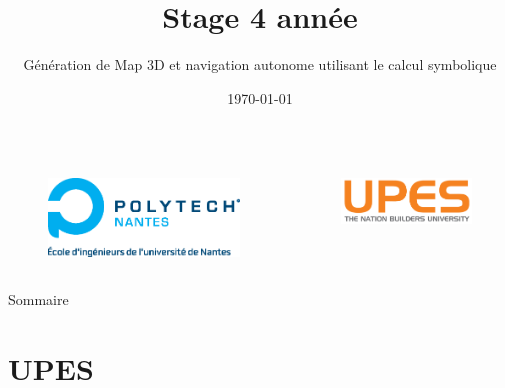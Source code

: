 \documentclass[xcolor=x11names,compress]{beamer}
\title{Stage 4\up{ème} année}
\subtitle{Génération de Map 3D et navigation autonome utilisant le calcul symbolique}
\author[Maxime PINEAU]{ 
   \texorpdfstring{
        \begin{columns}                
            \column{.33\linewidth}
            \centering
            {Enseignant Polytech\\ Benoît PARREIN}
            \column{.33\linewidth}
            \centering
            {Par \\ Maxime PINEAU}
            \column{.33\linewidth}
            \centering
            {Maître de stage\\ Niharika SINGH}
        \end{columns}
   }
   {Maxime PINEAU}
}
\date{\today}
\begin{document}
\section{}
\begin{frame}

	\begin{columns}[]
		\begin{figure}
			\centering
			\includegraphics[width=1\textwidth]{images/Polytech_Nantes_Universite}
		\end{figure}
					

		\begin{figure}
			\centering
			\includegraphics[width=1\textwidth]{images/upes}
		\end{figure}
	\end{columns}	
	
	\titlepage
\end{frame}


\begin{frame}{Sommaire}
	\tableofcontents
\end{frame}



\section[\scshape UPES]{\scshape UPES}
\end{document}
